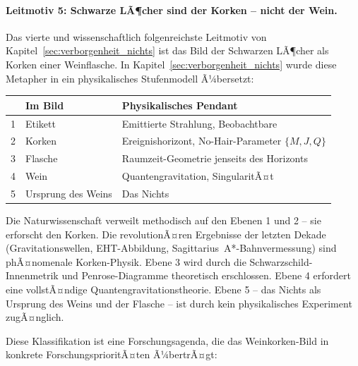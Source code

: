 ﻿\documentclass[12pt,a4paper]{report}
\begin{document}
\paragraph{Leitmotiv 5: Schwarze LÃ¶cher sind der Korken -- nicht der Wein.}

Das vierte und wissenschaftlich folgenreichste Leitmotiv von Kapitel~\ref{sec:verborgenheit_nichts} ist das Bild der Schwarzen LÃ¶cher als Korken einer Weinflasche. In Kapitel~\ref{sec:verborgenheit_nichts} wurde diese Metapher in ein physikalisches Stufenmodell Ã¼bersetzt:

\begin{center}
\begin{tabular}{lll}
	\hline
	\textbf{} & \textbf{Im Bild} & \textbf{Physikalisches Pendant} \\
	\hline
	1 & Etikett & Emittierte Strahlung, Beobachtbare \\
	2 & Korken & Ereignishorizont, No-Hair-Parameter $\{M, J, Q\}$ \\
	3 & Flasche & Raumzeit-Geometrie jenseits des Horizonts \\
	4 & Wein & Quantengravitation, SingularitÃ¤t \\
	5 & Ursprung des Weins & Das Nichts \\
	\hline
\end{tabular}
\end{center}

Die Naturwissenschaft verweilt methodisch auf den Ebenen 1 und 2 -- sie erforscht den Korken. Die revolutionÃ¤ren Ergebnisse der letzten Dekade (Gravitationswellen, EHT-Abbildung, Sagittarius~A*-Bahnvermessung) sind phÃ¤nomenale Korken-Physik. Ebene 3 wird durch die Schwarzschild-Innenmetrik und Penrose-Diagramme theoretisch erschlossen. Ebene 4 erfordert eine vollstÃ¤ndige Quantengravitationstheorie. Ebene 5 -- das Nichts als Ursprung des Weins und der Flasche -- ist durch kein physikalisches Experiment zugÃ¤nglich.

Diese Klassifikation ist eine Forschungsagenda, die das Weinkorken-Bild in konkrete ForschungsprioritÃ¤ten Ã¼bertrÃ¤gt:
\end{document}
